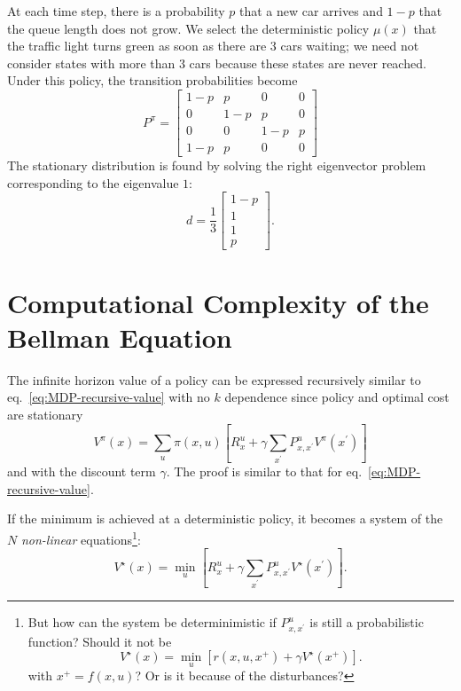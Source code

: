 At each time step, there is a probability $p$ that a new car arrives and $1-p$ that the queue length does not grow. We select the deterministic policy $\mu(x)$ that the traffic light turns green as soon as there are 3 cars waiting; we need not consider states with more than 3 cars because these states are never reached. Under this policy, the transition probabilities become
\begin{equation*}
  P^\pi =
  \begin{bmatrix}
    1-p & p & 0 & 0 \\
    0 & 1-p & p & 0 \\
    0 & 0 & 1-p & p \\
    1-p & p & 0 & 0
  \end{bmatrix}
\end{equation*}
The stationary distribution is found by solving the right eigenvector problem corresponding to the eigenvalue $1$:
\begin{equation*}
  d =
  \frac{1}{3}\begin{bmatrix}
               1-p \\ 1 \\ 1 \\ p
  \end{bmatrix}.
\end{equation*}

\section{Computational Complexity of the Bellman Equation}
\label{sec:MDP-computation-complexity-bellman-eq}

The infinite horizon value of a policy can be expressed recursively similar to eq.~\eqref{eq:MDP-recursive-value} with no $k$ dependence since policy and optimal cost are stationary
\begin{equation}
  \label{eq:MDP-recursive-value-infinite-horizon}
  V^\pi(x) = \sum_u \pi(x,u)\left[R^u_x + \gamma \sum_{x^\prime}P^u_{x,x^\prime} V^\pi(x^\prime)\right]
\end{equation}
and with the discount term $\gamma$. The proof is similar to that for eq.~\eqref{eq:MDP-recursive-value}.

If the minimum is achieved at a deterministic policy, it becomes a system of the $N$ \emph{non-linear} equations\footnote{But how can the system be determinimistic if $P_{x,x^\prime}^u$ is still a probabilistic function? Should it not be
  \begin{equation*}
    V^\star(x) = \min_u \left[r(x,u,x^+) + \gamma V^\star(x^+)\right].
  \end{equation*}
with $x^+ = f(x,u)$? Or is it because of the disturbances?}:
\begin{equation*}
  V^\star(x) = \min_u \left[R^u_x + \gamma \sum_{x^\prime}P^u_{x,x^\prime} V^\star(x^\prime)\right].
\end{equation*}

